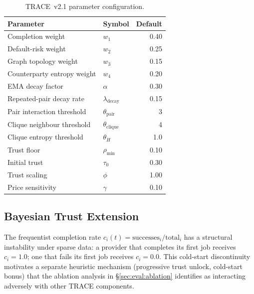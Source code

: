 \documentclass[sigconf,nonacm,10pt]{acmart}
\begin{document}
\begin{table}[t]
  \centering
  \caption{TRACE~v2.1 parameter configuration.}
  \label{tab:params}
  \small
  \begin{tabular}{llr}
    \toprule
    Parameter & Symbol & Default \\
    \midrule
    Completion weight            & $w_1$
                                 & 0.40 \\
    Default-risk weight          & $w_2$
                                 & 0.25 \\
    Graph topology weight        & $w_3$
                                 & 0.15 \\
    Counterparty entropy weight  & $w_4$
                                 & 0.20 \\
    EMA decay factor             & $\alpha$
                                 & 0.30 \\
    Repeated-pair decay rate     & $\lambda_{\text{decay}}$
                                 & 0.15 \\
    Pair interaction threshold   & $\theta_{\text{pair}}$
                                 & 3 \\
    Clique neighbour threshold   & $\theta_{\text{clique}}$
                                 & 4 \\
    Clique entropy threshold     & $\theta_H$
                                 & 1.0 \\
    Trust floor                  & $\rho_{\min}$
                                 & 0.10 \\
    Initial trust                & $\tau_0$
                                 & 0.30 \\
    Trust scaling                & $\phi$
                                 & 1.00 \\
    Price sensitivity            & $\gamma$
                                 & 0.10 \\
    \bottomrule
  \end{tabular}
\end{table}

\subsection{Bayesian Trust Extension}
\label{sec:bayesian}

The frequentist completion rate $c_i(t) = \text{successes}_i / \text{total}_i$
has a structural instability under sparse data: a provider that completes its
first job receives $c_i = 1.0$; one that fails its first job receives
$c_i = 0.0$. This cold-start discontinuity motivates a separate heuristic
mechanism (progressive trust unlock, cold-start bonus) that the ablation
analysis in \S\ref{sec:eval:ablation} identifies as interacting adversely
with other TRACE components.
\end{document}
